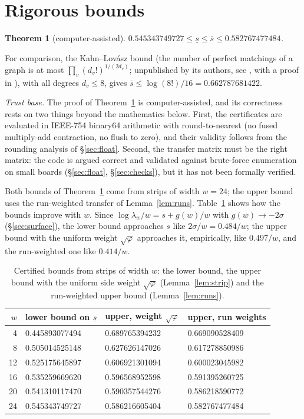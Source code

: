 \documentclass[11pt]{amsart}
\newtheorem{theorem}{Theorem}[section]
\theoremstyle{definition}
\theoremstyle{remark}
\begin{document}
\section{Rigorous bounds}\label{sec:bounds}

\begin{theorem}[computer-assisted]\label{thm:bounds}
$0.545343749727 \le \underline s \le \bar s \le 0.582767477484$.
\end{theorem}

For comparison, the Kahn--Lov\'asz bound (the number of perfect matchings of a graph is at most
$\prod_v (d_v!)^{1/(2 d_v)}$; unpublished by its authors, see \cite{cucklerkahn2009}, with a
proof in \cite{alonfriedland2008}), with all degrees $d_v \le 8$, gives
$\bar s \le \log(8!)/16 = 0.662787681422$.

\emph{Trust base.} The proof of Theorem~\ref{thm:bounds} is computer-assisted, and its correctness
rests on two things beyond the mathematics below. First, the certificates are evaluated in
IEEE-754 binary64 arithmetic with round-to-nearest (no fused multiply-add contraction, no flush to
zero), and their validity follows from the rounding analysis of \S\ref{sec:float}. Second, the
transfer matrix must be the right matrix: the code is argued correct and validated against
brute-force enumeration on small boards (\S\ref{sec:float}, \S\ref{sec:checks}), but it has not been
formally verified.

Both bounds of Theorem~\ref{thm:bounds} come from strips of width $w = 24$; the upper bound uses
the run-weighted transfer of Lemma~\ref{lem:runs}. Table~\ref{tab:bounds} shows how the bounds
improve with $w$. Since $\log \lambda_w / w = s + g(w)/w$ with $g(w) \to -2\sigma$
(\S\ref{sec:surface}), the lower bound approaches $s$ like $2\sigma/w = 0.484/w$; the upper bound
with the uniform weight $\sqrt\varphi$ approaches it, empirically, like $0.497/w$, and the
run-weighted one like $0.414/w$.

\begin{table}[ht]
\caption{Certified bounds from strips of width $w$: the lower bound, the upper bound with the
uniform side weight $\sqrt\varphi$ (Lemma~\ref{lem:strip}) and the run-weighted upper bound
(Lemma~\ref{lem:runs}).}\label{tab:bounds}
\begin{tabular}{rlll}
\toprule
$w$ & lower bound on $\underline s$ & upper, weight $\sqrt\varphi$ & upper, run weights \\
\midrule
4  & 0.445893077494 & 0.689765394232 & 0.669090528409 \\
8  & 0.505014525148 & 0.627626147026 & 0.617278850986 \\
12 & 0.525175645897 & 0.606921301094 & 0.600023045982 \\
16 & 0.535259669620 & 0.596568952598 & 0.591395260725 \\
20 & 0.541310117470 & 0.590357544276 & 0.586218590772 \\
24 & 0.545343749727 & 0.586216605404 & 0.582767477484 \\
\bottomrule
\end{tabular}
\end{table}
\end{document}
